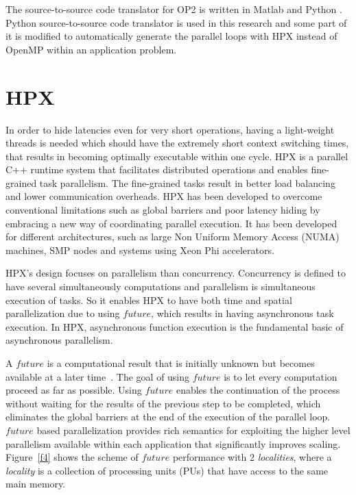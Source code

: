 \documentclass[conference]{IEEEtran}
\begin{document}
The source-to-source code translator for OP2 is written in Matlab and Python \cite{o3}. Python source-to-source code translator is used in this research and some part of it is modified to automatically generate the parallel loops with HPX instead of OpenMP within an application problem. 


\section{HPX}
\label{sec:hpx}

In order to hide latencies even for very short operations, having a light-weight threads is needed which should have the extremely short context switching times, that results in becoming optimally executable within one cycle. HPX is a parallel C++ runtime system that facilitates distributed operations and enables fine-grained task parallelism. The fine-grained tasks result in better load balancing and lower communication overheads. HPX has been developed  to overcome conventional limitations such as global barriers and poor latency hiding \cite{r6} by embracing a new way of coordinating parallel execution. It has been developed for different architectures, such as large Non Uniform Memory Access (NUMA) machines, SMP nodes and systems using Xeon Phi accelerators.


HPX's design focuses on parallelism than concurrency. Concurrency is defined to have several simultaneously computations and parallelism is simultaneous execution of tasks\cite{r15}. So it enables HPX to have both time and spatial parallelization \cite{r19} due to using \textit{$future$}, which results in having asynchronous task execution. In HPX, asynchronous function execution is the fundamental basic of asynchronous parallelism.

A \textit{$future$} is a computational result that is initially unknown but becomes available at a later time~\cite{r20}. The goal of using \textit{$future$} is to let every computation proceed as far as possible. Using \textit{$future$} enables the continuation of the process without waiting for the results of the previous step to be completed, which eliminates the global barriers at the end of the execution of the parallel loop. \textit{$future$} based parallelization provides rich semantics for exploiting the higher level parallelism available within each application that significantly improves scaling. Figure~\ref{f4} shows the scheme of \textit{$future$} performance with 2 \textit{localities}, where a \textit{locality} is a collection of processing units (PUs) that have access to the same main memory. 
\end{document}
